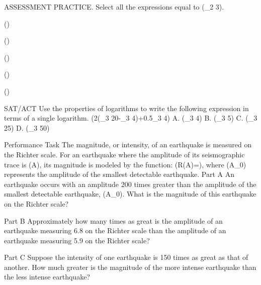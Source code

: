 \documentclass{article}
\newenvironment{practice}[2]{}{}        %
\newcommand{\answer}[1]{}               %
\begin{document}
\begin{practice}{38}{1}
ASSESSMENT PRACTICE. Select all the expressions equal to (\log_2 3).
\item ()
\item ()
\item ()
\item ()
\item ()
\answer{First and third expressions: (\frac{\log3}{\log2}), (\frac{\log_2 3}{\log_2 2}).}
\end{practice}
\begin{practice}{39}{1}
SAT/ACT Use the properties of logarithms to write the following expression in terms of a single logarithm.
(2(\log_3 20-\log_3 4)+0.5\log_3 4)
A. (\log_3 4)
B. (\log_3 5)
C. (\log_3 25)
D. (\log_3 50)
\answer{D}
\end{practice}
\begin{practice}{40}{2}
Performance Task The magnitude, or intensity, of an earthquake is measured on the Richter scale. For an earthquake where the amplitude of its seismographic trace is (A), its magnitude is modeled by the function:
(R(A)=\log{}),
where (A_0) represents the amplitude of the smallest detectable earthquake.
Part A An earthquake occurs with an amplitude 200 times greater than the amplitude of the smallest detectable earthquake, (A_0). What is the magnitude of this earthquake on the Richter scale?
\answer{Part A 2.3}
Part B Approximately how many times as great is the amplitude of an earthquake measuring 6.8 on the Richter scale than the amplitude of an earthquake measuring 5.9 on the Richter scale?
\answer{Part B (10^{0.9}), or about 7.94, times greater}
Part C Suppose the intensity of one earthquake is 150 times as great as that of another. How much greater is the magnitude of the more intense earthquake than the less intense earthquake?
\answer{Part C The magnitude of the more intense earthquake is about 2.2 greater than the magnitude of the less intense earthquake.}
\end{practice}
\end{document}
